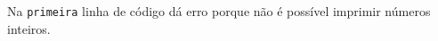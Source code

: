 \documentclass[12pt,varwidth=16cm,border=1pt]{standalone}
\begin{document}
Na \verb+primeira+ linha de código dá erro porque não é possível imprimir números inteiros.
\end{document}

